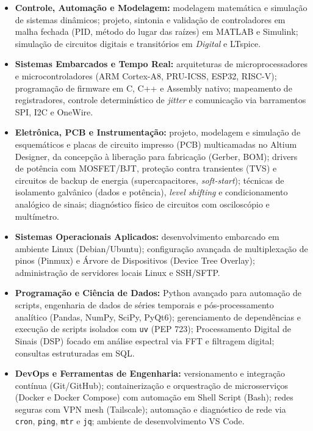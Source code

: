 \documentclass[a4paper,11pt]{article}
\begin{document}
\begin{itemize}
\item \textbf{Controle, Automação e Modelagem:} modelagem matemática e simulação de sistemas dinâmicos; projeto, sintonia e validação de controladores em malha fechada (PID, método do lugar das raízes) em MATLAB e Simulink; simulação de circuitos digitais e transitórios em \textit{Digital} e LTspice.
\item \textbf{Sistemas Embarcados e Tempo Real:} arquiteturas de microprocessadores e microcontroladores (ARM Cortex-A8, PRU-ICSS, ESP32, RISC-V); programação de firmware em C, C++ e Assembly nativo; mapeamento de registradores, controle determinístico de \textit{jitter} e comunicação via barramentos SPI, I2C e OneWire.
\item \textbf{Eletrônica, PCB e Instrumentação:} projeto, modelagem e simulação de esquemáticos e placas de circuito impresso (PCB) multicamadas no Altium Designer, da concepção à liberação para fabricação (Gerber, BOM); drivers de potência com MOSFET/BJT, proteção contra transientes (TVS) e circuitos de backup de energia (supercapacitores, \textit{soft-start}); técnicas de isolamento galvânico (dados e potência), \textit{level shifting} e condicionamento analógico de sinais; diagnóstico físico de circuitos com osciloscópio e multímetro.
\item \textbf{Sistemas Operacionais Aplicados:} desenvolvimento embarcado em ambiente Linux (Debian/Ubuntu); configuração avançada de multiplexação de pinos (Pinmux) e Árvore de Dispositivos (Device Tree Overlay); administração de servidores locais Linux e SSH/SFTP.
\item \textbf{Programação e Ciência de Dados:} Python avançado para automação de scripts, engenharia de dados de séries temporais e pós-processamento analítico (Pandas, NumPy, SciPy, PyQt6); gerenciamento de dependências e execução de scripts isolados com \texttt{uv} (PEP 723); Processamento Digital de Sinais (DSP) focado em análise espectral via FFT e filtragem digital; consultas estruturadas em SQL.
\item \textbf{DevOps e Ferramentas de Engenharia:} versionamento e integração contínua (Git/GitHub); containerização e orquestração de microsserviços (Docker e Docker Compose) com automação em Shell Script (Bash); redes seguras com VPN mesh (Tailscale); automação e diagnóstico de rede via \texttt{cron}, \texttt{ping}, \texttt{mtr} e \texttt{jq}; ambiente de desenvolvimento VS Code.
\end{itemize}
\end{document}
